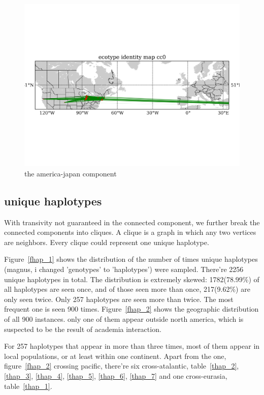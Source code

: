 \documentclass[a4paper,10pt]{article}
\begin{document}
\begin{figure}
\includegraphics[width=1\textwidth]{figures/ecotype_identity_cc0_site_network.png}
\caption{the america-japan component}\label{f27}
\end{figure}

\subsection{unique haplotypes}
With transivity not guaranteed in the connected component, we further break the connected components into cliques. A clique is a graph in which any two vertices are neighbors. Every clique could represent one unique haplotype.

Figure~\ref{fhap_1} shows the distribution of the number of times unique haplotypes (magnus, i changed 'genotypes' to 'haplotypes') were sampled. There're 2256 unique haplotypes in total. The distribution is extremely skewed: 1782(78.99\%) of all haplotypes are seen once, and of those seen more than once, 217(9.62\%) are only seen twice. Only 257 haplotypes are seen more than twice. The most frequent one is seen 900 times. Figure~\ref{fhap_2} shows the geographic distribution of all 900 instances. only one of them appear outside north america, which is suspected to be the result of academia interaction.

For 257 haplotypes that appear in more than three times, most of them appear in local populations, or at least within one continent. Apart from the one, figure~\ref{fhap_2} crossing pacific, there're six cross-atalantic, table~\ref{thap_2}, \ref{thap_3}, \ref{thap_4}, \ref{thap_5}, \ref{thap_6}, \ref{thap_7} and one cross-eurasia, table~\ref{thap_1}.
\end{document}
